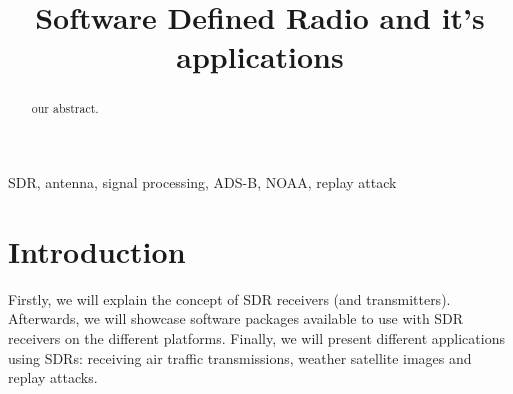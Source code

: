 \documentclass[conference]{IEEEtran}
\begin{document}
\title{Software Defined Radio and it's applications
}

\author{
	\and
}

\maketitle

\begin{abstract}
our abstract.\cite{Heuberger2017}
\end{abstract}

\begin{IEEEkeywords}
SDR, antenna, signal processing, ADS-B, NOAA, replay attack
\end{IEEEkeywords}

\section{Introduction} %

Firstly, we will explain the concept of SDR receivers (and transmitters). Afterwards, we will showcase software packages available to use with SDR receivers on the different platforms. Finally, we will present different applications using SDRs: receiving air traffic transmissions, weather satellite images and replay attacks.
\end{document}
